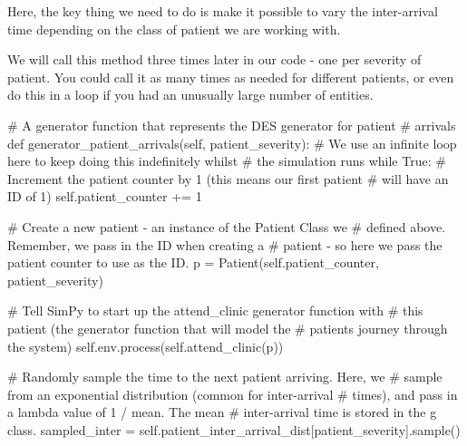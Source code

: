 \documentclass[
  letterpaper,
  DIV=11,
  numbers=noendperiod]{scrreprt}
\newenvironment{Shaded}{}{}
\newcommand{\CommentTok}[1]{\textcolor[rgb]{0.42,0.45,0.49}{#1}}
\newcommand{\ControlFlowTok}[1]{\textcolor[rgb]{0.84,0.23,0.29}{#1}}
\newcommand{\DecValTok}[1]{\textcolor[rgb]{0.00,0.36,0.77}{#1}}
\newcommand{\KeywordTok}[1]{\textcolor[rgb]{0.84,0.23,0.29}{#1}}
\newcommand{\NormalTok}[1]{\textcolor[rgb]{0.14,0.16,0.18}{#1}}
\newcommand{\OperatorTok}[1]{\textcolor[rgb]{0.14,0.16,0.18}{#1}}
\newcommand{\VariableTok}[1]{\textcolor[rgb]{0.89,0.38,0.04}{#1}}
\newcommand*\circled[1]{\tikz[baseline=(char.base)]{
          \node[shape=circle,draw,inner sep=1pt] (char) {{\scriptsize#1}};}}
\begin{document}
Here, the key thing we need to do is make it possible to vary the
inter-arrival time depending on the class of patient we are working
with.

We will call this method three times later in our code - one per
severity of patient. You could call it as many times as needed for
different patients, or even do this in a loop if you had an unusually
large number of entities.

\label{annotated-cell-74}%
\begin{Shaded}
\begin{Highlighting}[]
\CommentTok{\# A generator function that represents the DES generator for patient}
    \CommentTok{\# arrivals}
    \KeywordTok{def}\NormalTok{ generator\_patient\_arrivals(}\VariableTok{self}\NormalTok{, patient\_severity): }\hspace*{\fill}\NormalTok{\circled{1}}
        \CommentTok{\# We use an infinite loop here to keep doing this indefinitely whilst}
        \CommentTok{\# the simulation runs}
        \ControlFlowTok{while} \VariableTok{True}\NormalTok{:}
            \CommentTok{\# Increment the patient counter by 1 (this means our first patient}
            \CommentTok{\# will have an ID of 1)}
            \VariableTok{self}\NormalTok{.patient\_counter }\OperatorTok{+=} \DecValTok{1} \hspace*{\fill}\NormalTok{\circled{2}}

            \CommentTok{\# Create a new patient {-} an instance of the Patient Class we}
            \CommentTok{\# defined above.  Remember, we pass in the ID when creating a}
            \CommentTok{\# patient {-} so here we pass the patient counter to use as the ID.}
\NormalTok{            p }\OperatorTok{=}\NormalTok{ Patient(}\VariableTok{self}\NormalTok{.patient\_counter, patient\_severity) }\hspace*{\fill}\NormalTok{\circled{3}}

            \CommentTok{\# Tell SimPy to start up the attend\_clinic generator function with}
            \CommentTok{\# this patient (the generator function that will model the}
            \CommentTok{\# patient\textquotesingle{}s journey through the system)}
            \VariableTok{self}\NormalTok{.env.process(}\VariableTok{self}\NormalTok{.attend\_clinic(p)) }\hspace*{\fill}\NormalTok{\circled{4}}

            \CommentTok{\# Randomly sample the time to the next patient arriving.  Here, we}
            \CommentTok{\# sample from an exponential distribution (common for inter{-}arrival}
            \CommentTok{\# times), and pass in a lambda value of 1 / mean.  The mean}
            \CommentTok{\# inter{-}arrival time is stored in the g class.}
\NormalTok{            sampled\_inter }\OperatorTok{=} \VariableTok{self}\NormalTok{.patient\_inter\_arrival\_dist[patient\_severity].sample() }\hspace*{\fill}\NormalTok{\circled{5}}


\end{Highlighting}
\end{Shaded}
\end{document}
